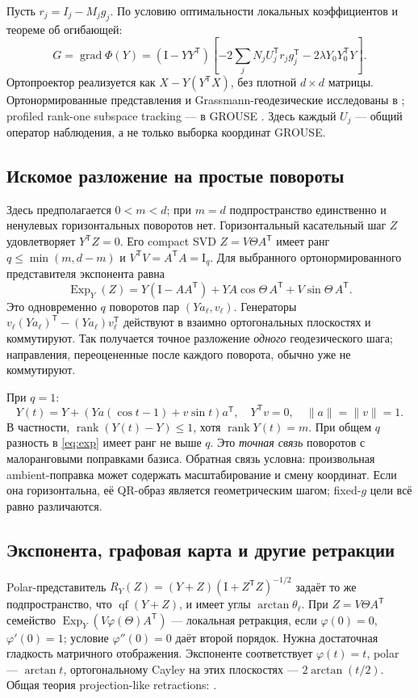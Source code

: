 \documentclass[11pt,a4paper]{article}
\newcommand{\Id}{\mathrm I}
\newcommand{\T}{^{\mathsf T}}
\newcommand{\Exp}{\operatorname{Exp}}
\newcommand{\grad}{\operatorname{grad}}
\newcommand{\qf}{\operatorname{qf}}
\DeclareMathOperator{\rank}{rank}
\begin{document}
Пусть $r_j=I_j-M_jg_j$. По условию оптимальности локальных коэффициентов
и теореме об огибающей:
\begin{equation}\label{eq:gradient}
 G=\grad\Phi(Y)=(\Id-YY\T)
 \left[-2\sum_jN_jU_j\T r_jg_j\T-2\lambda Y_0Y_0\T Y\right].
\end{equation}
Ортопроектор реализуется как $X-Y(Y\T X)$, без плотной $d\times d$ матрицы.
Ортонормированные представления и Grassmann-геодезические исследованы
в \cite{edelman}; profiled rank-one subspace tracking --- в GROUSE
\cite{grouse}. Здесь каждый $U_j$ --- общий оператор наблюдения, а не
только выборка координат GROUSE.

\subsection{Искомое разложение на простые повороты}\label{sec:rotations}
Здесь предполагается $0<m<d$; при $m=d$ подпространство единственно
и ненулевых горизонтальных поворотов нет.
Горизонтальный касательный шаг $Z$ удовлетворяет $Y\T Z=0$.
Его compact SVD $Z=V\Theta A\T$ имеет ранг
$q\le\min(m,d-m)$ и $V\T V=A\T A=\Id_q$.
Для выбранного ортонормированного представителя экспонента равна
\begin{equation}\label{eq:exp}
 \Exp_Y(Z)=Y(\Id-AA\T)
           +YA\cos\Theta\,A\T+V\sin\Theta\,A\T.
\end{equation}
Это одновременно $q$ поворотов пар $(Ya_\ell,v_\ell)$.
Генераторы $v_\ell(Ya_\ell)\T-(Ya_\ell)v_\ell\T$
действуют в взаимно ортогональных плоскостях и коммутируют.
Так получается точное разложение \emph{одного} геодезического шага;
направления, переоцененные после каждого поворота, обычно уже не коммутируют.

При $q=1$:
\begin{equation}\label{eq:rankoneexp}
 Y(t)=Y+(Ya(\cos t-1)+v\sin t)a\T,
 \quad Y\T v=0,\quad\|a\|=\|v\|=1.
\end{equation}
В частности, $\rank(Y(t)-Y)\le1$, хотя $\rank Y(t)=m$.
При общем $q$ разность в \eqref{eq:exp} имеет ранг не выше $q$.
Это \emph{точная связь} поворотов с малоранговыми поправками базиса.
Обратная связь условна: произвольная ambient-поправка может содержать
масштабирование и смену координат. Если она горизонтальна, её QR-образ
является геометрическим шагом; fixed-$g$ цели всё равно различаются.

\subsection{Экспонента, графовая карта и другие ретракции}
Polar-представитель $R_Y(Z)=(Y+Z)(\Id+Z\T Z)^{-1/2}$ задаёт то же
подпространство, что $\qf(Y+Z)$, и имеет углы $\arctan\theta_\ell$.
При $Z=V\Theta A\T$ семейство
$\Exp_Y(V\varphi(\Theta)A\T)$ --- локальная ретракция, если
$\varphi(0)=0$, $\varphi'(0)=1$; условие $\varphi''(0)=0$ даёт
второй порядок. Нужна достаточная гладкость матричного отображения.
Экспоненте соответствует $\varphi(t)=t$, polar --- $\arctan t$,
ортогональному Cayley на этих плоскостях --- $2\arctan(t/2)$.
Общая теория projection-like retractions: \cite{retractions}.
\end{document}
